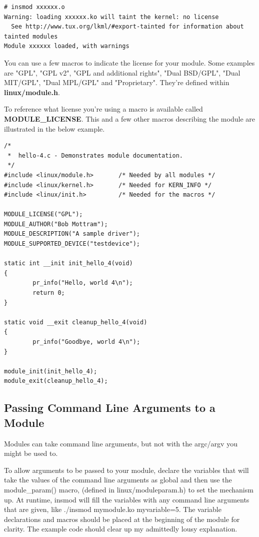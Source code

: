 \documentclass[11pt]{article}
\begin{document}
\begin{verbatim}
# insmod xxxxxx.o
Warning: loading xxxxxx.ko will taint the kernel: no license
  See http://www.tux.org/lkml/#export-tainted for information about tainted modules
Module xxxxxx loaded, with warnings
\end{verbatim}

You can use a few macros to indicate the license for your module. Some examples are "GPL", "GPL v2", "GPL and additional rights", "Dual BSD/GPL", "Dual MIT/GPL", "Dual MPL/GPL" and "Proprietary". They're defined within \textbf{linux/module.h}.

To reference what license you're using a macro is available called \textbf{MODULE\_LICENSE}. This and a few other macros describing the module are illustrated in the below example.

\begin{verbatim}
/*
 *  hello-4.c - Demonstrates module documentation.
 */
#include <linux/module.h>       /* Needed by all modules */
#include <linux/kernel.h>       /* Needed for KERN_INFO */
#include <linux/init.h>         /* Needed for the macros */

MODULE_LICENSE("GPL");
MODULE_AUTHOR("Bob Mottram");
MODULE_DESCRIPTION("A sample driver");
MODULE_SUPPORTED_DEVICE("testdevice");

static int __init init_hello_4(void)
{
        pr_info("Hello, world 4\n");
        return 0;
}

static void __exit cleanup_hello_4(void)
{
        pr_info("Goodbye, world 4\n");
}

module_init(init_hello_4);
module_exit(cleanup_hello_4);
\end{verbatim}

\subsection*{Passing Command Line Arguments to a Module}
\label{sec:org7533927}
Modules can take command line arguments, but not with the argc/argv you might be used to.

To allow arguments to be passed to your module, declare the variables that will take the values of the command line arguments as global and then use the module\_param() macro, (defined in linux/moduleparam.h) to set the mechanism up. At runtime, insmod will fill the variables with any command line arguments that are given, like ./insmod mymodule.ko myvariable=5. The variable declarations and macros should be placed at the beginning of the module for clarity. The example code should clear up my admittedly lousy explanation.
\end{document}
